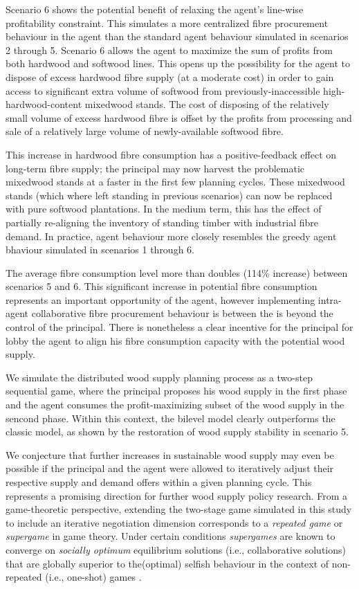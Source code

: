 Scenario 6 shows the potential benefit of relaxing the agent's line-wise profitability constraint. This simulates a more centralized fibre procurement behaviour in the agent than the standard agent behaviour simulated in scenarios 2 through 5. Scenario 6 allows the agent to maximize the sum of profits from both hardwood and softwood lines. This opens up the possibility for the agent to dispose of excess hardwood fibre supply (at a moderate cost) in order to gain access to significant extra volume of softwood from previously-inaccessible high-hardwood-content mixedwood stands. The cost of disposing of the relatively small volume of excess hardwood fibre is offset by the profits from processing and sale of a relatively large volume of newly-available softwood fibre. 

This increase in hardwood fibre consumption has a positive-feedback effect on long-term fibre supply; the principal may now harvest the problematic mixedwood stands at a faster in the first few planning cycles. These mixedwood stands (which where left standing in previous scenarios) can now be replaced with pure softwood plantations. In the medium term, this has the effect of partially re-aligning the inventory of standing timber with industrial fibre demand. In practice, agent behaviour more closely resembles the greedy agent bhaviour simulated in scenarios 1 through 6.

The average fibre consumption level more than doubles (114\% increase) between scenarios 5 and 6. This significant increase in potential fibre consumption represents an important opportunity of the agent, however implementing intra-agent collaborative fibre procurement behaviour is between the is beyond the control of the principal. There is nonetheless a clear incentive for the principal for lobby the agent to align his fibre consumption capacity with the potential wood supply. 

We simulate the distributed wood supply planning process as a two-step sequential game, where the principal proposes his wood supply in the first phase and the agent consumes the profit-maximizing subset of the wood supply in the sencond phase. Within this context, the bilevel model clearly outperforms the classic model, as shown by the restoration of wood supply stability in scenario 5.

We conjecture that further increases in sustainable wood supply may even be possible if the principal and the agent were allowed to iteratively adjust their respective supply and demand offers within a given planning cycle. This represents a promising direction for further wood supply policy research. From a game-theoretic perspective, extending the two-stage game simulated in this study to include an iterative negotiation dimension corresponds to a \emph{repeated game} or \emph{supergame} in game theory. Under certain conditions \emph{supergames} are known to converge on \emph{socially optimum} equilibrium solutions (i.e., collaborative solutions) that are globally superior to the(optimal) selfish behaviour in the context of non-repeated (i.e., one-shot) games \citep{fudenberg1991game}. 

